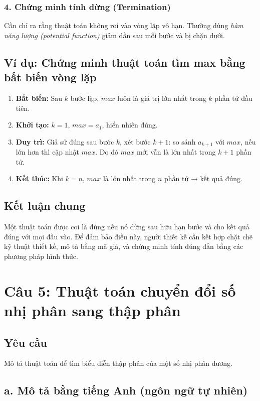 \documentclass[12pt,a4paper]{article}
\begin{document}
\subsubsection*{4. Chứng minh tính dừng (Termination)}
Cần chỉ ra rằng thuật toán không rơi vào vòng lặp vô hạn. Thường dùng \textit{hàm năng lượng (potential function)} giảm dần sau mỗi bước và bị chặn dưới.

\subsection*{Ví dụ: Chứng minh thuật toán tìm max bằng bất biến vòng lặp}
\begin{enumerate}
    \item \textbf{Bất biến:} Sau $k$ bước lặp, $max$ luôn là giá trị lớn nhất trong $k$ phần tử đầu tiên.
    \item \textbf{Khởi tạo:} $k=1$, $max = a_1$, hiển nhiên đúng.
    \item \textbf{Duy trì:} Giả sử đúng sau bước $k$, xét bước $k+1$: so sánh $a_{k+1}$ với $max$, nếu lớn hơn thì cập nhật $max$. Do đó $max$ mới vẫn là lớn nhất trong $k+1$ phần tử.
    \item \textbf{Kết thúc:} Khi $k=n$, $max$ là lớn nhất trong $n$ phần tử → kết quả đúng.
\end{enumerate}

\subsection*{Kết luận chung}
Một thuật toán được coi là đúng nếu nó dừng sau hữu hạn bước và cho kết quả đúng với mọi đầu vào. Để đảm bảo điều này, người thiết kế cần kết hợp chặt chẽ kỹ thuật thiết kế, mô tả bằng mã giả, và chứng minh tính đúng đắn bằng các phương pháp hình thức.


\section*{Câu 5: Thuật toán chuyển đổi số nhị phân sang thập phân}

\subsection*{Yêu cầu}
Mô tả thuật toán để tìm biểu diễn thập phân của một số nhị phân dương.

\subsection*{a. Mô tả bằng tiếng Anh (ngôn ngữ tự nhiên)}
\end{document}
